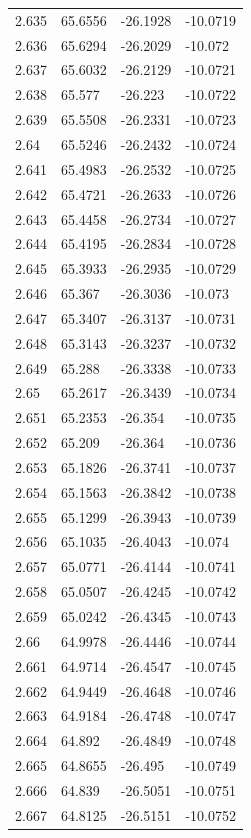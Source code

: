 \begin{tabular}{llll}
2.635 & 65.6556 & -26.1928 & -10.0719 \\
2.636 & 65.6294 & -26.2029 & -10.072 \\
2.637 & 65.6032 & -26.2129 & -10.0721 \\
2.638 & 65.577 & -26.223 & -10.0722 \\
2.639 & 65.5508 & -26.2331 & -10.0723 \\
2.64 & 65.5246 & -26.2432 & -10.0724 \\
2.641 & 65.4983 & -26.2532 & -10.0725 \\
2.642 & 65.4721 & -26.2633 & -10.0726 \\
2.643 & 65.4458 & -26.2734 & -10.0727 \\
2.644 & 65.4195 & -26.2834 & -10.0728 \\
2.645 & 65.3933 & -26.2935 & -10.0729 \\
2.646 & 65.367 & -26.3036 & -10.073 \\
2.647 & 65.3407 & -26.3137 & -10.0731 \\
2.648 & 65.3143 & -26.3237 & -10.0732 \\
2.649 & 65.288 & -26.3338 & -10.0733 \\
2.65 & 65.2617 & -26.3439 & -10.0734 \\
2.651 & 65.2353 & -26.354 & -10.0735 \\
2.652 & 65.209 & -26.364 & -10.0736 \\
2.653 & 65.1826 & -26.3741 & -10.0737 \\
2.654 & 65.1563 & -26.3842 & -10.0738 \\
2.655 & 65.1299 & -26.3943 & -10.0739 \\
2.656 & 65.1035 & -26.4043 & -10.074 \\
2.657 & 65.0771 & -26.4144 & -10.0741 \\
2.658 & 65.0507 & -26.4245 & -10.0742 \\
2.659 & 65.0242 & -26.4345 & -10.0743 \\
2.66 & 64.9978 & -26.4446 & -10.0744 \\
2.661 & 64.9714 & -26.4547 & -10.0745 \\
2.662 & 64.9449 & -26.4648 & -10.0746 \\
2.663 & 64.9184 & -26.4748 & -10.0747 \\
2.664 & 64.892 & -26.4849 & -10.0748 \\
2.665 & 64.8655 & -26.495 & -10.0749 \\
2.666 & 64.839 & -26.5051 & -10.0751 \\
2.667 & 64.8125 & -26.5151 & -10.0752 \\

\end{tabular}

